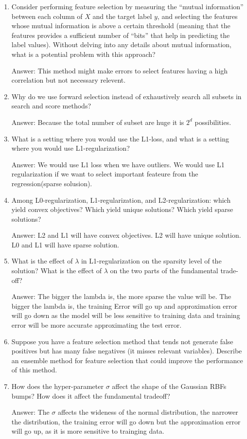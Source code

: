 \documentclass{article}
\def\ans#1{\par\gre{Answer: #1}}
\def\gre#1{{\color{gre}#1}}
\def\enum#1{\begin{enumerate}#1\end{enumerate}}
\begin{document}
\enum{
\item Consider performing feature selection by measuring the ``mutual information'' between each column of $X$ and the target label $y$, and selecting the features whose mutual information is above a certain threshold (meaning that the features provides a sufficient number of ``bits'' that help in predicting the label values). Without delving into any details about mutual information, what is a potential problem with this approach? \ans{This method might make errors to select features having a high correlation but not necessary relevent.}
\item Why do we use forward selection instead of exhaustively search all subsets in search and score methods? \ans{Because the total number of subset are huge it is $2^d$ possibilities.}
\item What is a setting where you would use the L1-loss, and what is a setting where you would use L1-regularization? \ans{We would use L1 loss when we have outliers. We would use L1 regularization if we want to select important feateure from the regression(sparse solusion).}
\item Among L0-regularization, L1-regularization, and L2-regularization: which yield convex objectives? Which yield unique solutions? Which yield sparse solutions? \ans{L2 and L1 will have convex objectives. L2 will have unique solution. L0 and L1 will have sparse solution.}
\item What is the effect of $\lambda$ in L1-regularization on the sparsity level of the solution? What is the effect of $\lambda$ on the two parts of the fundamental trade-off? \ans{The bigger the lambda is, the more sparse the value will be. The bigger the lambda is, the training Error will go up and approximation error will go down as the model will be less sensitive to training data and training error will be more accurate approximating the test error.}
\item Suppose you have a feature selection method that tends not generate false positives but has many false negatives (it misses relevant variables). Describe an ensemble method for feature selection that could improve the performance of this method.
\item How does the hyper-parameter $\sigma$ affect the shape of the Gaussian RBFs bumps? How does it affect the fundamental tradeoff? \ans{The $\sigma$ affects the wideness of the normal distribution, the narrower the distribution, the training error will go down but the approximation error will go up, as it is more sensitive to trainging data.}
}
\end{document}

